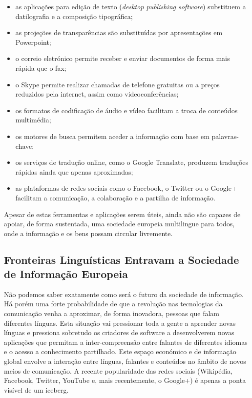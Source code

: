 \begin{multicols}{2}
\begin{itemize}
      \item as aplicações para edição de texto (\textit{desktop publishing software}) substituem a datilografia e a composição tipográfica;
      \item as projeções de transparências são substituídas por apresentações em Powerpoint;
      \item o correio eletrónico permite receber e enviar do\-cu\-men\-tos de forma mais rápida que o fax;
      \item o Skype permite realizar chamadas de telefone gratuitas ou a preços reduzidos pela internet, assim como videoconferências;
      \item os formatos de codificação de áudio e vídeo facilitam a troca de conteúdos multimédia;
      \item os motores de busca  permitem aceder a informação com base em palavras-chave;
      \item os serviços de tradução online, como o Google Translate, produzem traduções rápidas ainda que apenas aproximadas;
      \item as plataformas de redes sociais como o Facebook, o Twitter ou o Google+  facilitam a comunicação, a colaboração e a partilha de informação.
\end{itemize}

 Apesar de estas ferramentas e aplicações serem úteis, ainda não são capazes de apoiar, de forma sustentada, uma sociedade europeia multilingue 
para todos, onde a informação e os bens possam circular livremente.

\subsection{Fronteiras Linguísticas Entravam a Sociedade de In\-for\-ma\-ção Eu\-ro\-peia}
  
Não podemos saber exatamente como será o futuro da sociedade de informação. Há porém uma forte probabilidade de que a revolução nas tecnologias da comunicação venha a aproximar, de forma inovadora, pessoas que falam diferentes línguas. 
Esta situação vai pressionar toda a gente a aprender novas línguas e pressiona sobretudo os criadores de software 
a desenvolverem novas aplicações que permitam a inter-compreensão entre falantes de diferentes idiomas e o acesso a conhecimento partilhado. 
Este espaço económico e de informação global envolve a interação entre línguas, falantes e conteúdos no âmbito de novos meios de comunicação. A recente popularidade das redes sociais (Wikipédia, Facebook, Twitter, YouTube e, mais recentemente, o Google+) é apenas a ponta visível de um iceberg. 


\end{multicols}
